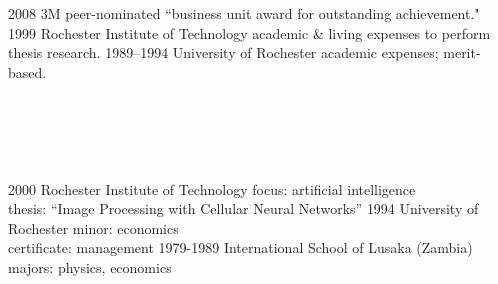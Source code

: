 \documentclass[]{friggeri-cv} %
\begin{document}
\section{{} {} {\normalsize {}~~}}

\begin{entrylist}
\entry
{2008}
{3M}
{}
{peer-nominated ``business unit award for outstanding achievement."}
\entry
{1999}
{Rochester Institute of Technology}
{}
{academic \& living expenses to perform thesis research.}
\entry
{1989--1994}
{University of Rochester}
{}
{academic expenses; merit-based.}
\end{entrylist}



\section{{} {} {\normalsize {}~~}}

\begin{entrylist}
\entry
{2000}
{Rochester Institute of Technology}
{}
{focus: artificial intelligence\\
thesis: ``Image Processing with Cellular Neural Networks''}
\entry
{1994}
{University of Rochester}
{}
{minor: economics\\
certificate: management} 
\entry
{1979-1989}
{International School of Lusaka (Zambia)}
{}
{majors: physics, economics}
\end{entrylist}
\end{document}
